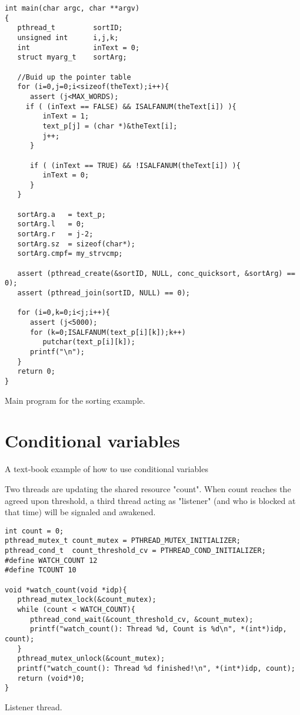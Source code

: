 \begin{table}[!hbp]
\begin{verbatim}
int main(char argc, char **argv)
{ 
   pthread_t         sortID;
   unsigned int      i,j,k;
   int               inText = 0;
   struct myarg_t    sortArg;

   //Buid up the pointer table
   for (i=0,j=0;i<sizeof(theText);i++){
      assert (j<MAX_WORDS);
     if ( (inText == FALSE) && ISALFANUM(theText[i]) ){
         inText = 1;
         text_p[j] = (char *)&theText[i];
         j++;
      }

      if ( (inText == TRUE) && !ISALFANUM(theText[i]) ){
         inText = 0;
      }
   }

   sortArg.a   = text_p;
   sortArg.l   = 0;
   sortArg.r   = j-2;
   sortArg.sz  = sizeof(char*);
   sortArg.cmpf= my_strvcmp;

   assert (pthread_create(&sortID, NULL, conc_quicksort, &sortArg) == 0);
   assert (pthread_join(sortID, NULL) == 0);

   for (i=0,k=0;i<j;i++){
      assert (j<5000);
      for (k=0;ISALFANUM(text_p[i][k]);k++)
         putchar(text_p[i][k]);
      printf("\n");
   }
   return 0;
}
\end{verbatim}
\caption{Main program for the sorting example.\label{ccsort_main}}
\end{table}

\chapter{Conditional variables}
A text-book example of how to use conditional variables

Two threads are updating the shared resource "count". When count reaches
the agreed upon threshold, a third thread acting as "listener" (and who
is blocked at that time) will be signaled and awakened.

\begin{table}[!hbp]
\begin{verbatim}
int count = 0;
pthread_mutex_t count_mutex = PTHREAD_MUTEX_INITIALIZER;
pthread_cond_t  count_threshold_cv = PTHREAD_COND_INITIALIZER;
#define WATCH_COUNT 12
#define TCOUNT 10

void *watch_count(void *idp){
   pthread_mutex_lock(&count_mutex);
   while (count < WATCH_COUNT){
      pthread_cond_wait(&count_threshold_cv, &count_mutex);
      printf("watch_count(): Thread %d, Count is %d\n", *(int*)idp, count);
   }
   pthread_mutex_unlock(&count_mutex);
   printf("watch_count(): Thread %d finished!\n", *(int*)idp, count);
   return (void*)0;
}
\end{verbatim}
\caption{Listener thread.\label{cond_watcher}}
\end{table}


